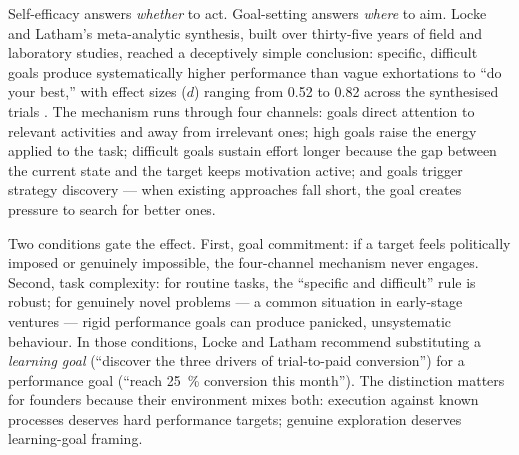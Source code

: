 Self-efficacy answers \emph{whether} to act. Goal-setting answers \emph{where} to aim. Locke
and Latham's meta-analytic synthesis, built over thirty-five years of field and laboratory
studies, reached a deceptively simple conclusion: specific, difficult goals produce
systematically higher performance than vague exhortations to ``do your best,'' with effect
sizes ($d$) ranging from \num{0.52} to \num{0.82} across the synthesised trials
\parencite{locke2002building}. The mechanism runs through four channels: goals direct
attention to relevant activities and away from irrelevant ones; high goals raise the energy
applied to the task; difficult goals sustain effort longer because the gap between the current
state and the target keeps motivation active; and goals trigger strategy discovery --- when
existing approaches fall short, the goal creates pressure to search for better ones.

Two conditions gate the effect. First, goal commitment: if a target feels politically imposed
or genuinely impossible, the four-channel mechanism never engages. Second, task complexity:
for routine tasks, the ``specific and difficult'' rule is robust; for genuinely novel problems ---
a common situation in early-stage ventures --- rigid performance goals can produce panicked,
unsystematic behaviour. In those conditions, Locke and Latham recommend substituting a
\emph{learning goal} (``discover the three drivers of trial-to-paid conversion'') for a
performance goal (``reach \qty{25}{\percent} conversion this month''). The distinction matters
for founders because their environment mixes both: execution against known processes deserves
hard performance targets; genuine exploration deserves learning-goal framing.

